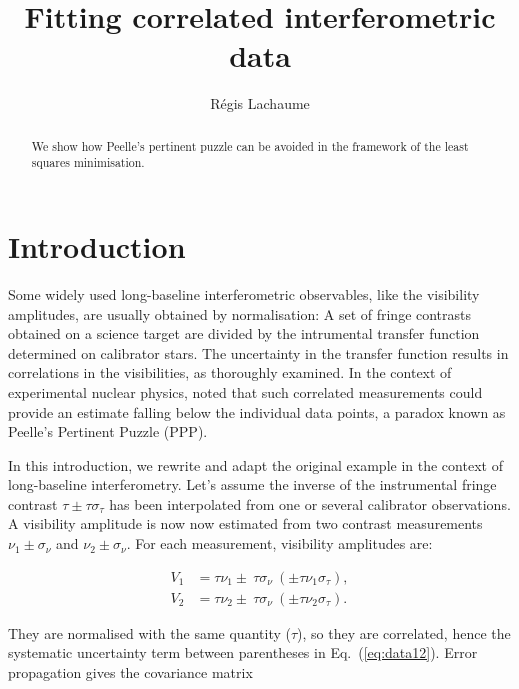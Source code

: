 \documentclass[twocolumn]{article}
\def\eqref#1{Eq.~(\ref{eq:#1})}
\def\norm{_\tau}
\def\meas{_\nu}
\def\system#1#2#3{\ensuremath{#1 \pm\ #2\ (\pm #3)}}
\def\raw{\ensuremath{\nu}}
\def\cot{\ensuremath{\tau}}
\def\data{\ensuremath{{\scriptstyle V}}}
\def\dev{\ensuremath{\sigma}}
\def\reldev{\ensuremath{\dev\norm}}
\def\absdev{\ensuremath{\dev\meas}}
\begin{document}
\title{Fitting correlated interferometric data}
\author{R\'egis Lachaume}
\maketitle

\begin{abstract}
We show how Peelle's pertinent puzzle can be avoided in the framework of the least squares minimisation.
\end{abstract}

\section{Introduction}

Some widely used long-baseline interferometric observables, like the visibility amplitudes, are usually obtained by normalisation: A set of fringe contrasts obtained on a science target are divided by the intrumental transfer function determined on calibrator stars. The uncertainty in the transfer function results in correlations in the visibilities, as \citet{PER03} thoroughly examined.  In the context of experimental nuclear physics, \citet{PEE87} noted that such correlated measurements could provide an estimate falling below the individual data points, a paradox known as Peelle's Pertinent Puzzle (PPP). 

In this introduction, we rewrite and adapt the original example in the context of long-baseline interferometry. Let's assume the inverse of the instrumental fringe contrast $\cot \pm \cot\reldev$ has been interpolated from one or several calibrator observations. A visibility amplitude is now now estimated from two contrast measurements $\raw_1 \pm \absdev$ and $\raw_2 \pm \absdev$.  For each measurement, visibility amplitudes are:

\begin{subequations}
\begin{align}
    \data_1 &= \system{\cot\raw_1}{\cot\absdev}{\cot\raw_1\reldev},\\
    \data_2 &= \system{\cot\raw_2}{\cot\absdev}{\cot\raw_2\reldev}.
\end{align}
\label{eq:data12}
\end{subequations}

They are normalised with the same quantity (\cot), so they are correlated, hence the systematic uncertainty term between parentheses in \eqref{data12}. Error propagation gives the covariance matrix
\end{document}
